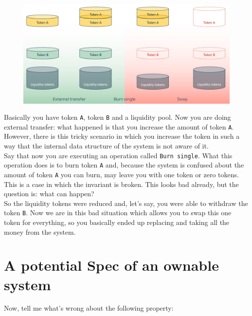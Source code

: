 \documentclass[oneside]{book}
\begin{document}
    \pagebreak

    \begin{figure}[htbp!]
        \centering
        \includegraphics[width=\linewidth]{img/sushiswap_trident_bug}
    \end{figure}

    Basically you have token \texttt{A}, token \texttt{B} and a liquidity pool.
    Now you are doing external transfer: what happened is that you increase the amount of token \texttt{A}.
    However, there is this tricky scenario in which you increase the token in such a way that the internal data structure of the system is not aware of it.\\

    Say that now you are executing an operation called \texttt{Burn single}.
    What this operation does is to burn token \texttt{A} and, because the system is confused about the amount of token \texttt{A} you can burn, may leave you with one token or zero tokens.
    This is a case in which the invariant is broken.
    This looks bad already, but the question is: what can happen?\\


    So the liquidity tokens were reduced and, let's say, you were able to withdraw the token \texttt{B}.
    Now we are in this bad situation which allows you to swap this one token for everything, so you basically ended up replacing and taking all the money from the system.\\

    \pagebreak

    \section{A potential Spec of an ownable system}

    Now, tell me what's wrong about the following property:
\end{document}
